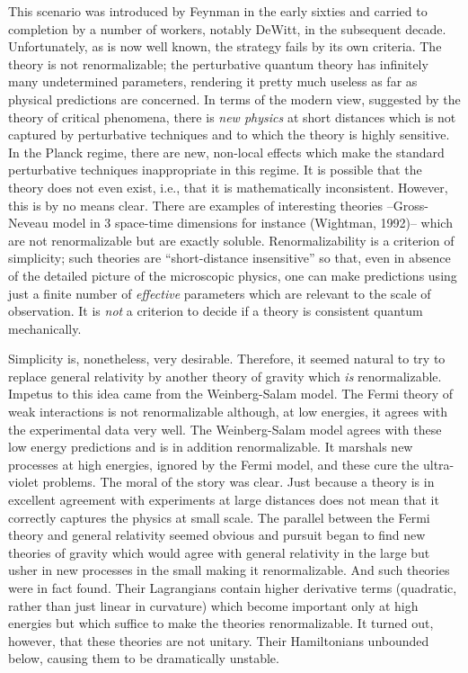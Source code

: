 This scenario was introduced by Feynman in the early sixties and carried
to completion by a number of workers, notably DeWitt, in the subsequent
decade. Unfortunately, as is now well known, the strategy fails by its
own criteria. The theory is not renormalizable; the perturbative quantum theory
has infinitely many undetermined parameters, rendering it pretty much useless
as far as physical predictions are concerned. In terms of the modern view,
suggested by the theory of critical phenomena, there is {\it new physics}
at short distances which is not captured by perturbative techniques and to
which the theory is highly sensitive. In the Planck regime, there are
new, non-local effects which make the standard perturbative techniques
inappropriate in this regime. It is possible that the theory does not even
exist, i.e., that it is mathematically inconsistent. However, this is by no
means clear. There are examples of interesting theories --Gross-Neveau model
in 3 space-time dimensions for instance (Wightman, 1992)-- which are not
renormalizable but are exactly soluble. Renormalizability is a criterion of
simplicity; such theories are ``short-distance insensitive'' so that, even in
absence of the detailed picture of the microscopic physics, one can make
predictions using just a finite number of {\it effective} parameters which are
relevant to the scale of observation. It is {\it not} a criterion to decide
if a theory is consistent quantum mechanically.

Simplicity is, nonetheless, very desirable. Therefore, it seemed natural
to try to replace general relativity by another theory of gravity
which {\it is} renormalizable. Impetus to this idea came from the
Weinberg-Salam model. The Fermi theory of weak interactions is not
renormalizable although, at low energies, it agrees with the experimental data
very well. The Weinberg-Salam model agrees with these low energy predictions
and is in addition renormalizable. It marshals new processes at high
energies, ignored by the Fermi model, and these cure the ultra-violet problems.
The moral of the story was clear. Just because a theory is in excellent
agreement with experiments at large distances does not mean that it correctly
captures the physics at small scale. The parallel between the Fermi theory and
general relativity seemed obvious and pursuit began to find new theories of
gravity which would agree with general relativity in the large but usher in
new processes in the small making it renormalizable. And such theories were
in fact found. Their Lagrangians contain higher derivative terms (quadratic,
rather than just linear in curvature) which become important only at high
energies but which suffice to make the theories renormalizable. It turned out,
however, that these theories are not unitary. Their Hamiltonians unbounded
below, causing them to be dramatically unstable.

